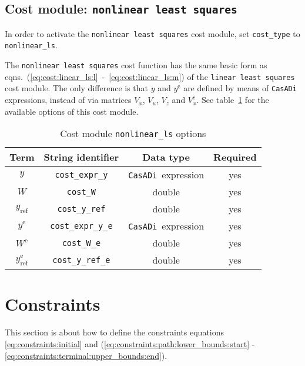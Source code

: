 \documentclass[english]{article}
\newcommand{\code}[1]{\texttt{#1}}
\newcommand{\casadi}{\texttt{CasADi}}
\newcommand{\ind}[1]{_{\textrm{#1}}}
\newcommand{\terminal}{^{\textrm{e}}}
\newcommand{\mandatory}{yes}
\begin{document}
\subsection{Cost module: \code{nonlinear least squares}}\label{sec:cost:nonlinear_ls}
%
In order to activate the \code{nonlinear least squares} cost module, set \code{cost\_type} to \code{nonlinear\_ls}.

The \code{nonlinear least squares} cost function has the same basic form as eqns.~(\ref{eq:cost:linear_ls:l}~-~\ref{eq:cost:linear_ls:m}) of the \code{linear least squares} cost module.
The only difference is that $ y $ and $ y\terminal $ are defined by means of \casadi{} expressions, instead of via matrices $ V_x $, $ V_u $, $ V_z $ and $ V_x\terminal $.
%
See table~\ref{tab:cost:nonlinear_ls} for the available options of this cost module.
%
\begin{table}[ht!]
    \centering
    \caption{Cost module \code{nonlinear\_ls} options} \label{tab:cost:nonlinear_ls}
    \begin{tabular}{cccc}
        \toprule
        Term & String identifier & Data type & Required \\ \midrule
        $ y $ & \code{cost\_expr\_y}    & \casadi~expression  & \mandatory   \\
        $ W $ & \code{cost\_W}    & double  & \mandatory   \\
        $ y\ind{ref} $ & \code{cost\_y\_ref}    & double & \mandatory    \\ [1em]
        $ y\terminal $ & \code{cost\_expr\_y\_e}    & \casadi~expression  & \mandatory   \\
        $ W\terminal $ & \code{cost\_W\_e}    & double & \mandatory   \\
        $ y\ind{ref}\terminal $ & \code{cost\_y\_ref\_e}    & double  & \mandatory   \\
        \bottomrule
    \end{tabular}
\end{table}
%
\section{Constraints}\label{sec:constraints}
%
This section is about how to define the constraints equations \eqref{eq:constraints:initial} and (\ref{eq:constraints:path:lower_bounds:start} - \ref{eq:constraints:terminal:upper_bounds:end}).
\end{document}
